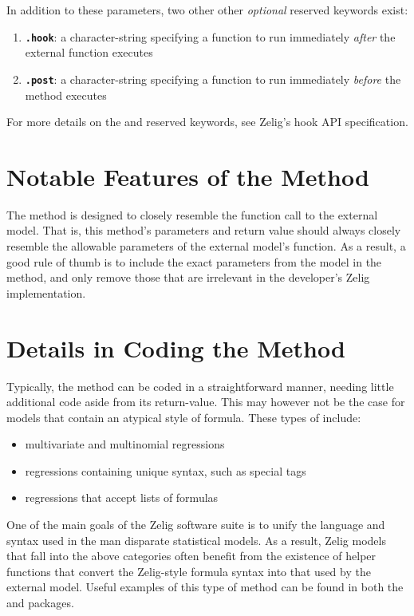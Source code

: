 {\noindent In addition to these parameters, two other other \emph{optional} reserved keywords exist:}

\begin{enumerate}
	\item {\bf\tt .hook}: a character-string specifying a function to run immediately \emph{after} the external function executes
	\item {\bf\tt .post}: a character-string specifying a function to run immediately \emph{before} the  method executes
\end{enumerate}

{\noindent For more details on the  and  reserved keywords, see Zelig's hook API specification.}



\section{Notable Features of the  Method}

The  method is designed to closely resemble the function call to the external model. That is, this method's parameters and return value should always closely resemble the allowable parameters of the external model's function. As a result, a good rule of thumb is to include the exact parameters from the model in the  method, and only remove those that are irrelevant in the developer's Zelig implementation.


\section{Details in Coding the  Method}

Typically, the  method can be coded in a straightforward manner, needing little additional code aside from its return-value. This may however not be the case for models that contain an atypical style of formula. These types of  include:

\begin{itemize}
	\item multivariate and multinomial regressions
	\item regressions containing unique syntax, such as special tags
	\item regressions that accept lists of formulas
\end{itemize}

One of the main goals of the Zelig software suite is to unify the language and syntax used in the man disparate statistical models. As a result, Zelig models that fall into the above categories often benefit from the existence of helper functions that convert the Zelig-style formula syntax into that used by the external model. Useful examples of this type of  method can be found in both the  and  packages.



